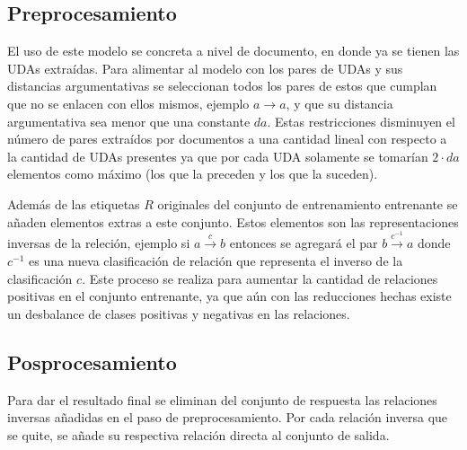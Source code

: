 
\subsection{Preprocesamiento}

El uso de este modelo se concreta a nivel de documento, en donde ya se tienen las UDAs extraídas. Para alimentar
al modelo con los pares de UDAs y sus distancias argumentativas se seleccionan todos los pares de estos que cumplan
que no se enlacen con ellos mismos, ejemplo $a \rightarrow a$, y que su distancia argumentativa sea menor que una
constante $da$. Estas restricciones disminuyen el número de pares extraídos por documentos a una cantidad lineal 
con respecto a la cantidad de UDAs presentes ya que por cada UDA solamente se tomarían $2 · da$ elementos como máximo
(los que la preceden y los que la suceden). 

Además de las etiquetas $R$ originales del conjunto de entrenamiento entrenante se añaden elementos extras a este
conjunto. Estos elementos son las representaciones inversas de la releción, ejemplo si $a \xrightarrow{c} b$ entonces 
se agregará el par $b \xrightarrow{c^{-1}} a$ donde $c^{-1}$ es una nueva clasificación de relación que representa
el inverso de la clasificación $c$. Este proceso se realiza para aumentar la cantidad de relaciones positivas en el
conjunto entrenante, ya que aún con las reducciones hechas existe un desbalance de clases positivas y negativas en
las relaciones.

\subsection{Posprocesamiento}

Para dar el resultado final se eliminan del conjunto de respuesta las relaciones inversas añadidas en el paso de 
preprocesamiento. Por cada relación inversa que se quite, se añade su respectiva relación directa al conjunto
de salida.
